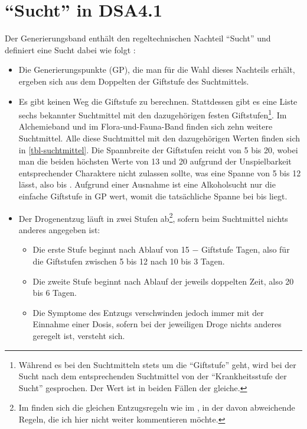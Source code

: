 \section{\enquote{Sucht} in DSA4.1}
Der Generierungsband  enthält den regeltechnischen Nachteil \enquote{Sucht} und definiert eine Sucht dabei wie folgt \cite[S.~271]{WdH}:

\begin{itemize}
	\item Die Generierungspunkte (GP), die man für die Wahl dieses Nachteils erhält, ergeben sich aus dem Doppelten der Giftstufe des Suchtmittels.
	\item Es gibt keinen Weg die Giftstufe zu berechnen. Stattdessen gibt es eine Liste sechs bekannter Suchtmittel mit den dazugehörigen festen Giftstufen\footnote{Während es bei den Suchtmitteln stets um die \enquote{Giftstufe} geht, wird bei der Sucht nach dem entsprechenden Suchtmittel von der \enquote{Krankheitsstufe der Sucht} gesprochen. Der Wert ist in beiden Fällen der gleiche.}. Im Alchemieband  und im Flora-und-Fauna-Band  finden sich zehn weitere Suchtmittel. Alle diese Suchtmittel mit den dazugehörigen Werten finden sich in \vref{tbl-suchtmittel}. Die Spannbreite der Giftstufen reicht von 5 bis 20, wobei man die beiden höchsten Werte von 13 und 20 aufgrund der Unspielbarkeit entsprechender Charaktere nicht zulassen sollte, was eine Spanne von 5 bis 12 lässt, also  bis . Aufgrund einer Ausnahme ist eine Alkoholsucht nur die einfache Giftstufe in GP wert, womit die tatsächliche Spanne bei  bis  liegt.
	\item Der Drogenentzug läuft in zwei Stufen ab\footnote{Im  finden sich die gleichen Entzugsregeln wie im , in der  \cite[S.~225]{ZBA} davon abweichende Regeln, die ich hier nicht weiter kommentieren möchte.}, sofern beim Suchtmittel nichts anderes angegeben ist:
		\begin{itemize}
			\item Die erste Stufe beginnt nach Ablauf von 15 − Giftstufe Tagen, also für die Giftstufen zwischen 5 bis 12 nach 10 bis 3 Tagen.
			\item Die zweite Stufe beginnt nach Ablauf der jeweils doppelten Zeit, also 20 bis 6 Tagen.
			\item Die Symptome des Entzugs verschwinden jedoch immer mit der Einnahme einer Dosis, sofern bei der jeweiligen Droge nichts anderes geregelt ist, versteht sich.
		\end{itemize}

\end{itemize}
